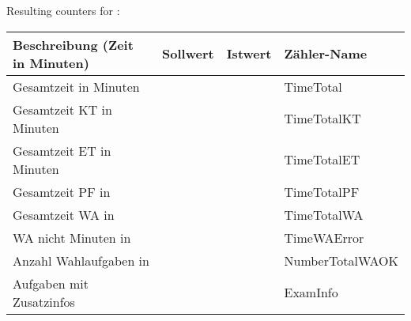 {}
\setcounter{aufgabenanzahl}{\theaufgabennummer-1}

\newcommand{\countertabline}[4]{ #4 & 
                                 #2 & 
                                 \ifthenelse{\equal{#2}{#3}}%
                                            {\textcolor{gruen}{#3}}%
                                            {\textcolor{rot}{#3}} & 
                                 #1 \\ \hline}



Resulting counters for \ExamWhich:

\bigskip

   \renewcommand{\arraystretch}{1.25}
     \begin{tabular}{|l|r|r|l|} \hline
       Beschreibung (Zeit in Minuten) & Sollwert & Istwert & Zähler-Name\\ \hline\hline
       \countertabline{TimeTotal}{\theTimeTotalOK}{\theTimeTotal}{Gesamtzeit in Minuten \ExamWhich}
       \countertabline{TimeTotalKT}{\theTimeTotalKTOK}{\theTimeTotalKT}{Gesamtzeit KT in Minuten \ExamWhich}
       \countertabline{TimeTotalET}{\theTimeTotalETOK}{\theTimeTotalET}{Gesamtzeit ET in Minuten \ExamWhich}
       \countertabline{TimeTotalPF}{\theTimeTotalPFOK}{\theTimeTotalPF}{Gesamtzeit PF in \ExamWhich}
       \countertabline{TimeTotalWA}{\theTimeTotalWAOK}{\theTimeTotalWA}{Gesamtzeit WA in \ExamWhich}
       \countertabline{TimeWAError}{\theTimeWAErrorOK}{\theTimeWAError}{WA nicht \theTimeWAOK{} Minuten in \ExamWhich}
       \countertabline{NumberTotalWAOK}{\theNumberTotalWAOK}{\theNumberTotalWA}{Anzahl Wahlaufgaben in \ExamWhich}
       \countertabline{ExamInfo}{\theaufgabenanzahl}{\theExamInfo}{\theaufgabenanzahl{} Aufgaben mit \theExamInfo{} Zusatzinfos}
     \end{tabular}
   \renewcommand{\arraystretch}{1.0}
